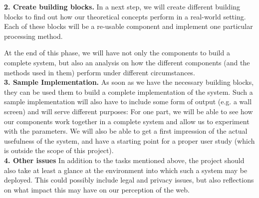 \documentclass[a4paper]{danarticle}
\begin{document}
    \textbf{2. Create building blocks.} In a next step, we will create
    different building blocks to find out how our theoretical 
    concepts perform in a real-world setting. Each of these blocks  will
    be a re-usable component and implement one particular processing method.
    
    At the end of this phase, we will have not only the components to build a
    complete system, but also an analysis on  how the different 
    components (and the methods used in them) perform under different
    circumstances.
    \\
    
    \textbf{3. Sample Implementation.} As soon as we have the necessary
    building blocks, they can be used them to build a complete implementation of the
    system. Such a sample implementation will also have to include some form of
    output (e.g. a wall screen) and will serve different purposes: For one part,
    we will be able to see how our components work together in a complete
    system and allow us to experiment with the parameters. We will also be able
    to get a first impression of the actual usefulness of the system, and have a
    starting point for a proper user study (which is outside the scope of this
    project).
    \\
    
    \textbf{4. Other issues}
    In addition to the tasks mentioned above, the project should also take
    at least a glance at the environment into which such a system may be
    deployed. This could possibly include legal and privacy issues, but 
    also reflections on what impact this may have on our perception of 
    the web.
\end{document}
